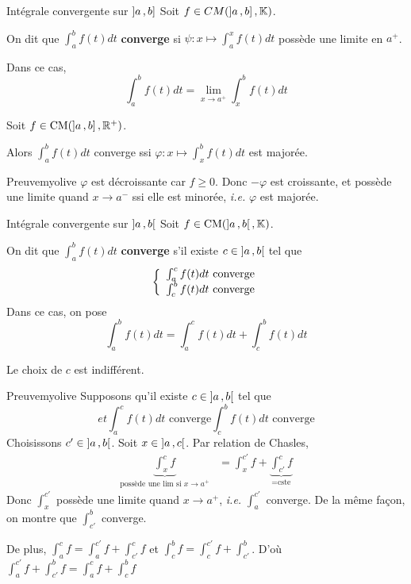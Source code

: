     \begin{defi}{Intégrale convergente sur $\left] a \, , b \right]$}{}
        Soit $f \in CM(\left] a \, , b \right],\mathbb{K})$.

        On dit que $\int_{a}^{b} f(t)dt$ \textbf{converge} si $\psi : x \mapsto \int_{a}^{x} f(t)dt$ possède une limite en $a^+$.

        Dans ce cas, 
        \[ \int_{a}^{b} f(t)dt = \lim_{x \to a^+} \int_{x}^{b}f(t)dt \]
    \end{defi}

    \begin{prop}{}{}
        Soit $f \in \operatorname{CM}(\left] a \, , b \right],\mathbb{R}^+)$. 

        Alors $\int_{a}^{b}f(t)dt$ converge ssi $\varphi : x \mapsto \int_{x}^{b} f(t)dt$ est majorée.
    \end{prop}

    \begin{demo}{Preuve}{myolive}
        $\varphi$ est décroissante car $f \geq 0$. Donc $-\varphi$ est croissante, et possède une limite quand $x \to a^-$ ssi elle est minorée, \textit{i.e.} $\varphi$ est majorée.
    \end{demo}

    \begin{defi}{Intégrale convergente sur $\left] a \, , b \right[$}{}
        Soit $f \in \operatorname{CM}(\left] a \, , b \right[,\mathbb{K})$.

        On dit que $\int_{a}^{b} f(t)dt$ \textbf{converge} s’il existe $c \in \left] a \, , b \right[$ tel que 
        \[ \et{\int_{a}^{c}f(t)dt \text{ converge}}{\int_{c}^{b}f(t)dt \text{ converge}} \]   
        Dans ce cas, on pose 
        \[ \int_{a}^{b} f(t)dt = \int_{a}^{c} f(t)dt + \int_{c}^{b} f(t)dt \]   
    \end{defi}

    \begin{prop}{}{}
        Le choix de $c$ est indifférent.
    \end{prop}

    \begin{demo}{Preuve}{myolive}
        Supposons qu’il existe $c \in \left] a \, , b \right[$ tel que 
        \[ et{\int_{a}^{c}f(t)dt \text{ converge}}{\int_{c}^{b}f(t)dt \text{ converge}} \] 
        Choisissons $c' \in \left] a \, , b \right[$.
        Soit $x \in \left] a \, , c \right[$. Par relation de Chasles, 
        \begin{align*}
            \underbrace{\int_{x}^{c}f}_{\text{possède une lim si } x \to a^+} 
            &= \int_{x}^{c'}f + \underbrace{\int_{c'}^{c}f}_{= \text{cste}}
        \end{align*}
        Donc $\int_{x}^{c'}$ possède une limite quand $x \to a^+$, \textit{i.e.} $\int_{a}^{c'}$ converge. De la même façon, on montre que $\int_{c'}^{b}$ converge.

        De plus, $\int_{a}^{c} f = \int_{a}^{c'} f + \int_{c'}^{c}f$ et $\int_{c}^{b}f = \int_{c}^{c'}f + \int_{c'}^{b}$. D’où $\int_{a}^{c'} f + \int_{c'}^{b} f = \int_{a}^{c} f + \int_{c}^{b} f$
    \end{demo}

